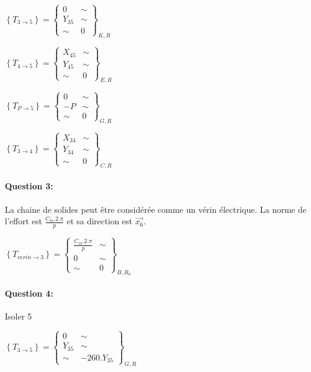 $\left\{T_{3\rightarrow 5}\right\}=\left\{
\begin{array}{cc}
0 & \sim \\
Y_{35} & \sim \\
\sim & 0
\end{array}
\right\}_{K,R}$

$\left\{T_{4\rightarrow 5}\right\}=\left\{
\begin{array}{cc}
X_{45} & \sim \\
Y_{45} & \sim \\
\sim & 0
\end{array}
\right\}_{E,R}$

$\left\{T_{P\rightarrow 5}\right\}=\left\{
\begin{array}{cc}
0 & \sim \\
-P & \sim \\
\sim & 0
\end{array}
\right\}_{G,R}$

$\left\{T_{3\rightarrow 4}\right\}=\left\{
\begin{array}{cc}
X_{34} & \sim \\
Y_{34} & \sim \\
\sim & 0
\end{array}
\right\}_{C,R}$

\paragraph{Question 3:}

La chaine de solides peut être considérée comme un vérin électrique. La norme de l'effort est $\frac{C_m.2.\pi}{p}$ et sa direction est $\overrightarrow{x_6}$.

$\left\{T_{verin \rightarrow 3}\right\}=\left\{
\begin{array}{cc}
\frac{C_m.2.\pi}{p} & \sim \\
0 & \sim \\
\sim & 0
\end{array}
\right\}_{B,R_6}$


\paragraph{Question 4:}

Isoler 5

$\left\{T_{3\rightarrow 5}\right\}=\left\{
\begin{array}{cc}
0 & \sim \\
Y_{35} & \sim \\
\sim & -260.Y_{35}
\end{array}
\right\}_{G,R}$

